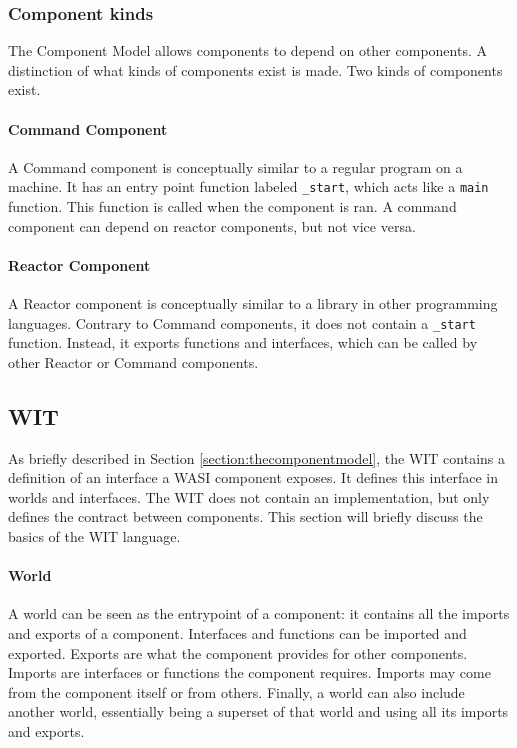 \subsubsection{Component kinds}
\label{section:component_kinds}
The Component Model allows components to depend on other components. A distinction of what kinds of components exist is made. Two kinds of components exist.

\paragraph{Command Component}
A Command component is conceptually similar to a regular program on a machine. It has an entry point function labeled \texttt{\_start}, which acts like a \texttt{main} function. This function is called when the component is ran. A command component can depend on reactor components, but not vice versa.

\paragraph{Reactor Component}
A Reactor component is conceptually similar to a library in other programming languages. Contrary to Command components, it does not contain a \texttt{\_start} function. Instead, it exports functions and interfaces, which can be called by other Reactor or Command components.


\subsection{\acrfull{WIT}}
\label{section:WIT}

As briefly described in Section \ref{section:thecomponentmodel}, the \acrfull{WIT} contains a definition of an interface a \acrshort{WASI} component exposes. It defines this interface in worlds and interfaces. The \acrshort{WIT} does not contain an implementation, but only defines the contract between components. This section will briefly discuss the basics of the \acrshort{WIT} language.

\paragraph{World}
A world can be seen as the entrypoint of a component: it contains all the imports and exports of a component. Interfaces and functions can be imported and exported. Exports are what the component provides for other components. Imports are interfaces or functions the component requires. Imports may come from the component itself or from others. Finally, a world can also include another world, essentially being a superset of that world and using all its imports and exports.

